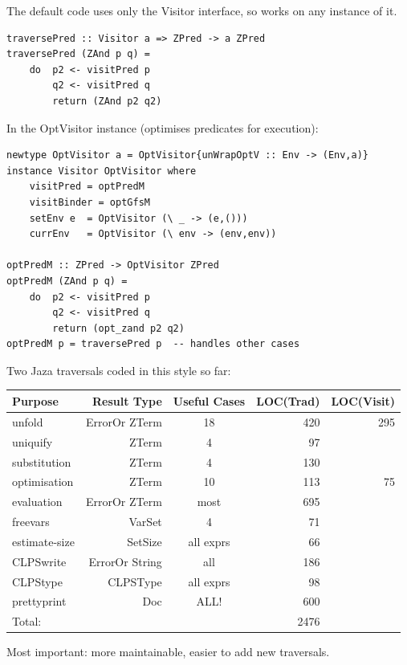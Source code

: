 \begin{slide}
The default code uses only the Visitor interface,
so works on any instance of it.

\begin{verbatim}
traversePred :: Visitor a => ZPred -> a ZPred
traversePred (ZAnd p q) =
    do  p2 <- visitPred p
        q2 <- visitPred q
        return (ZAnd p2 q2)
\end{verbatim}

In the OptVisitor instance (optimises predicates for execution):
\begin{verbatim}
newtype OptVisitor a = OptVisitor{unWrapOptV :: Env -> (Env,a)}
instance Visitor OptVisitor where
    visitPred = optPredM
    visitBinder = optGfsM
    setEnv e  = OptVisitor (\ _ -> (e,()))
    currEnv   = OptVisitor (\ env -> (env,env))

optPredM :: ZPred -> OptVisitor ZPred
optPredM (ZAnd p q) =
    do  p2 <- visitPred p
        q2 <- visitPred q
        return (opt_zand p2 q2)
optPredM p = traversePred p  -- handles other cases
\end{verbatim}
\end{slide}

\begin{slide}

Two Jaza traversals coded in this style so far:
{
\begin{tabular}{lrcrr}
Purpose         & Result Type   & Useful Cases& LOC(Trad) & LOC(Visit)\\
\hline
unfold          & ErrorOr ZTerm & 18         & 420  & 295 \\%
uniquify        & ZTerm         & 4          & 97   &\\%
substitution    & ZTerm         & 4          & 130  &\\%
optimisation    & ZTerm         & 10         & 113  & 75 \\%
evaluation      & ErrorOr ZTerm & most       & 695 \\
\hline
freevars        & VarSet        & 4          & 71  \\
estimate-size   & SetSize       & all exprs  & 66  \\ 
CLPSwrite       & ErrorOr String& all        & 186 \\
CLPStype        & CLPSType      & all exprs  & 98  \\
prettyprint     & Doc           & ALL!       & 600 \\
\hline
Total:          &               &            & 2476 \\
\hline
\end{tabular}
}
Most important: more maintainable, easier to add new traversals.
\end{slide}

